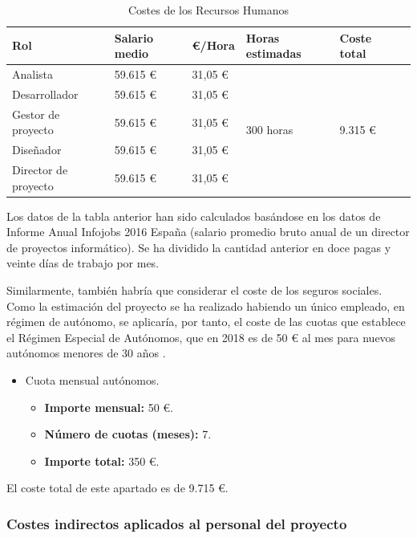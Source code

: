 \documentclass[twoside]{report}
\begin{document}
\begin{table}[H]
\center
\begin{tabular}{|l|l|l|l|l|l|}
\hline
Rol                & Salario medio & \euro/Hora   & Horas estimadas & Coste total \\ \hline
Analista           & 59.615 \euro      & 31,05 \euro & \multirow{5}{*}{300 horas} & \multirow{5}{*}{9.315 \euro} \\\cline{1-3}
Desarrollador      & 59.615 \euro      & 31,05 \euro  & & \\\cline{1-3}
Gestor de proyecto & 59.615 \euro      & 31,05 \euro & & \\ \cline{1-3}
Diseñador          & 59.615 \euro      & 31,05 \euro & & \\ \cline{1-3}
Director de proyecto & 59.615 \euro    & 31,05 \euro & & \\ \cline{1-3}
\hline
\end{tabular}
\caption{Costes de los Recursos Humanos}
\end{table}

Los datos de la tabla anterior han sido calculados basándose en los datos de \cite{infojobs2016} Informe Anual Infojobs 2016 España (salario promedio bruto anual de un director de proyectos informático). Se ha dividido la cantidad anterior en doce pagas y veinte días de trabajo por mes.

Similarmente, también habría que considerar el coste de los seguros sociales. Como la estimación del proyecto se ha realizado  habiendo un único empleado, en régimen de autónomo, se aplicaría, por tanto, el coste de las cuotas que establece el Régimen Especial de Autónomos, que en 2018 es de 50 \euro \vspace{0.1cm} al mes para nuevos autónomos menores de 30 años \cite{segsocialautonomos}.

\begin{itemize}
\item Cuota mensual autónomos.
	\begin{itemize}
	\item \textbf{Importe mensual:} 50 \euro.
	\item \textbf{Número de cuotas (meses): } 7.
	\item \textbf{Importe total: } 350 \euro.
	\end{itemize}
\end{itemize}

El coste total de este apartado es de 9.715 \euro.

\subsubsection{Costes indirectos aplicados al personal del proyecto}
\end{document}
